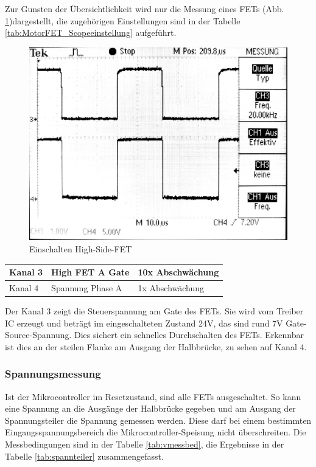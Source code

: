 Zur Gunsten der Übersichtlichkeit wird nur die Messung eines FETs (Abb. \ref{fig:hsfet})dargestellt, die zugehörigen Einstellungen sind in der Tabelle \ref{tab:MotorFET_Scopeeinstellung} aufgeführt.

\begin{figure} [H]
	\centering
	\includegraphics[width=0.6\linewidth]{images/valmcfet.jpg}
	\caption{Einschalten High-Side-FET}
	\label{fig:hsfet}
\end{figure}

\begin{center}
	\begin{tabular}{l|l|l}
		\hline 
		Kanal 3 & High FET A Gate & 10x Abschwächung\\ \hline
		Kanal 4 & Spannung Phase A & 1x Abschwächung\\ \hline
	\end{tabular}
	\label{tab:MotorFET_Scopeeinstellung}
\end{center}

Der Kanal 3 zeigt die Steuerspannung am Gate des FETs. Sie wird vom Treiber IC erzeugt und beträgt im eingeschalteten Zustand 24V, das sind rund 7V Gate-Source-Spannung. Dies sichert ein schnelles Durchschalten des FETs. Erkennbar ist dies an der steilen Flanke am Ausgang der Halbbrücke, zu sehen auf Kanal 4.

\subsubsection*{Spannungsmessung}
Ist der Mikrocontroller im Resetzustand, sind alle FETs ausgeschaltet. So kann eine Spannung an die Ausgänge der Halbbrücke gegeben und am Ausgang der Spannungsteiler die Spannung gemessen werden. Diese darf bei einem bestimmten Eingangsspannungsbereich die Mikrocontroller-Speisung nicht überschreiten. Die Messbedingungen sind in der Tabelle \ref{tab:vmessbed}, die Ergebnisse in der Tabelle \ref{tab:spannteiler} zusammengefasst.

